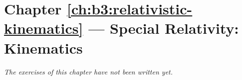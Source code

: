 \section*{Chapter \ref{ch:b3:relativistic-kinematics} --- Special Relativity: Kinematics}


\emph{The exercises of this chapter have not been written yet.}
